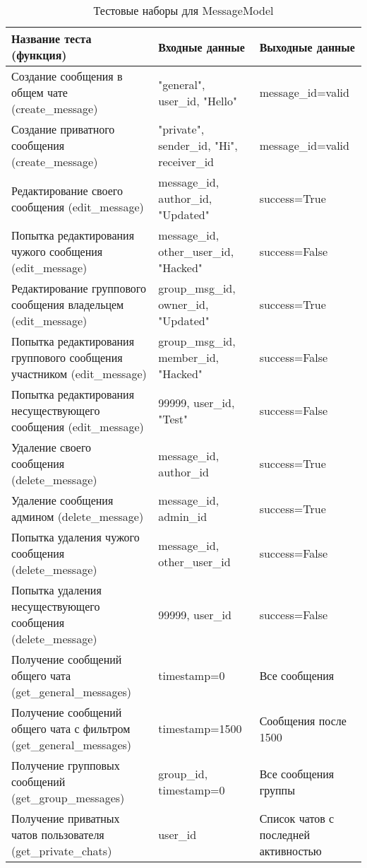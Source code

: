 \begin{xltabular}{\linewidth}{|X|X|X|}
	\caption{Тестовые наборы для MessageModel\label{messagemodel-tests}}\\ \hline
	\centrow Название теста (функция) & \centrow Входные данные & \centrow Выходные данные \\ \hline
	Создание сообщения в общем чате (create\_message) & "general", user\_id, "Hello" & message\_id=valid \\ \hline
	Создание приватного сообщения (create\_message) & "private", sender\_id, "Hi", receiver\_id & message\_id=valid \\ \hline
	Редактирование своего сообщения (edit\_message) & message\_id, author\_id, "Updated" & success=True \\ \hline
	Попытка редактирования чужого сообщения (edit\_message) & message\_id, other\_user\_id, "Hacked" & success=False \\ \hline
	Редактирование группового сообщения владельцем (edit\_message) & group\_msg\_id, owner\_id, "Updated" & success=True \\ \hline
	Попытка редактирования группового сообщения участником (edit\_message) & group\_msg\_id, member\_id, "Hacked" & success=False \\ \hline
	Попытка редактирования несуществующего сообщения (edit\_message) & 99999, user\_id, "Test" & success=False \\ \hline
	Удаление своего сообщения (delete\_message) & message\_id, author\_id & success=True \\ \hline
	Удаление сообщения админом (delete\_message) & message\_id, admin\_id & success=True \\ \hline
	Попытка удаления чужого сообщения (delete\_message) & message\_id, other\_user\_id & success=False \\ \hline
	Попытка удаления несуществующего сообщения (delete\_message) & 99999, user\_id & success=False \\ \hline
	Получение сообщений общего чата (get\_general\_messages) & timestamp=0 & Все сообщения \\ \hline
	Получение сообщений общего чата с фильтром (get\_general\_messages) & timestamp=1500 & Сообщения после 1500 \\ \hline
	Получение групповых сообщений (get\_group\_messages) & group\_id, timestamp=0 & Все сообщения группы \\ \hline
	Получение приватных чатов пользователя (get\_private\_chats) & user\_id & Список чатов с последней активностью \\ \hline

\end{xltabular}
